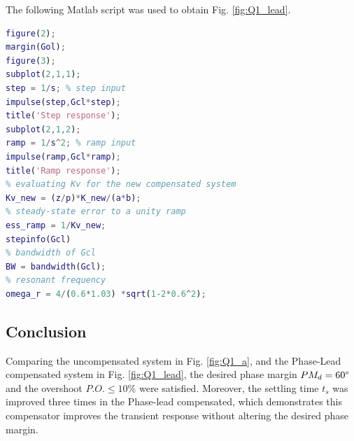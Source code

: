 \documentclass[11pt, a4paper]{article}
\begin{document}
\begin{table}[!ht]
	\centering
	\caption{Performance evaluation. }
	\label{tab:lead}
\end{table}

The following Matlab script was used to obtain Fig. \ref{fig:Q1_lead}.

\begin{lstlisting}[language=matlab, caption={}, label={}]
%% c) evaluating the system to unit step and unit ramp
figure(2);
margin(Gol);
figure(3);
subplot(2,1,1);
step = 1/s; % step input
impulse(step,Gcl*step); 
title('Step response');
subplot(2,1,2);
ramp = 1/s^2; % ramp input
impulse(ramp,Gcl*ramp);
title('Ramp response');
% evaluating Kv for the new compensated system
Kv_new = (z/p)*K_new/(a*b);
% steady-state error to a unity ramp
ess_ramp = 1/Kv_new;
stepinfo(Gcl)
% bandwidth of Gcl
BW = bandwidth(Gcl);
% resonant frequency
omega_r = 4/(0.6*1.03) *sqrt(1-2*0.6^2);
\end{lstlisting}


\subsection{Conclusion}
Comparing the uncompensated system in Fig. \ref{fig:Q1_a}, and the Phase-Lead compensated system in Fig. \ref{fig:Q1_lead}, the desired phase margin $PM_d=60\degree$ and the overshoot $P.O.\leq10 \%$ were satisfied. Moreover, the settling time $t_s$ was improved three times in the Phase-lead compensated, which demonstrates this compensator improves the transient response without altering the desired phase margin.
\end{document}

